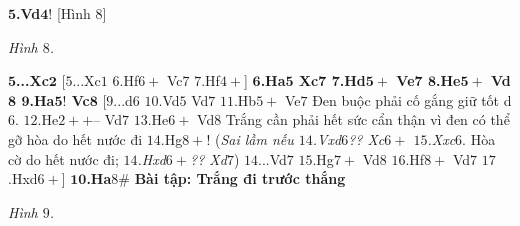 \begin{multicols}{2}
	\vskip 0.1cm
	$\pmb{5}$\textbf{\color{gocco}.Vd}$\pmb{4!}$ [Hình $8$]
	\begin{center}
		\newgame
		\scalebox{0.8}\showboard
		\vskip 0.1cm
		\textit{\small\color{gocco}Hình $8$.}
	\end{center}
	$\pmb{5}$\textbf{\color{gocco}...Xc}$\pmb{2}$ [$5$...Xc$1$ $6$.Hf$6+$ Vc$7$ $7$.Hf$4+$]
	\vskip 0.1cm
	$\pmb{6}$\textbf{\color{gocco}.Ha$\pmb{5}$ Xc$\pmb{7}$ $\pmb{7}$.Hd$\pmb{5+}$ Ve$\pmb{7}$ $\pmb{8}$.He$\pmb{5+}$ Vd$\pmb{8}$ $\pmb{9}$.Ha$\pmb{5!}$ Vc}$\pmb{8}$ [$9$...d$6$ $10$.Vd$5$ Vd$7$ $11$.Hb$5+$ Ve$7$ Đen buộc phải cố gắng giữ tốt d$6$. $12$.He$2++–$ Vd$7$ $13$.He$6+$ Vd$8$ Trắng cần phải hết sức cẩn thận vì đen có thể gỡ hòa do hết nước đi $14$.Hg$8+!$ (\textit{Sai lầm nếu $14$.Vxd$6$?? Xc$6+$ $15$.Xxc$6$}. Hòa cờ do hết nước đi; \textit{$14$.Hxd$6+$?? Xd}$7$) $14$...Vd$7$ $15$.Hg$7+$ Vd$8$ $16$.Hf$8+$ Vd$7$ $17$.Hxd$6+$]
	\vskip 0.1cm
	$\pmb{10}$\textbf{\color{gocco}.Ha}$8\#$
	\vskip 0.1cm
	\textbf{\color{gocco}Bài tập: Trắng đi trước thắng}
	\begin{center}
		\newgame
		\scalebox{0.8}\showboard
		\vskip 0.1cm
		\textit{\small\color{gocco}Hình $9$.}
	\end{center}
\end{multicols}




